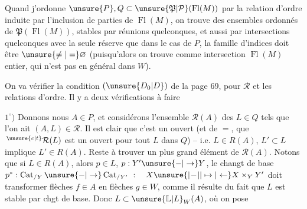Quand j'ordonne  $\unsure{P}, Q\subset\unsure{\mathfrak{P}|\mathcal{P}}(\operatorname{Fl}(M))$
par la relation d'ordre induite par l'inclusion
de parties de $\operatorname{Fl}(M)$, on trouve des ensembles
ordonnés de $\mathfrak{P}(\operatorname{Fl}(M))$, stables par réunions
quelconques, et aussi par intersections quelconques
avec la seule réserve que dans le cas de
$P$, la famille  d'indices doit être $\unsure{\ne|=}\varnothing$
(puisqu'alors on trouve comme intersection
$\operatorname{Fl}(M)$  entier, qui n'est pas en général
 dans $W$).

On va vérifier la condition $(\unsure{D_0|D})$ de la
page 69, pour $\mathcal{R}$ et les relations d'ordre.
Il y a deux vérifications à faire

$1^\circ)$ Donnons nous $A\in P$, et considérons l'ensemble
$\mathcal R(A)$ des $L\in Q$ tels que l'on ait 
$(A,L)\in\mathcal R$. Il est clair que c'est un ouvert
(et de $=$, que $\,{}^{\unsure{c|t}}\mathcal R(L)$ est un ouvert  pour
tout $L$ dans $Q$) -- i.e. $L\in R(A)$, $L'\subset L$
implique $L'\in R(A)$. Reste à trouver un
plus grand élément de $\mathcal R(A)$. Notons que
si $L\in R(A)$, alors 
$p\in L$, $p:Y'\unsure{-|\to}Y$, le changt de base
$p^{*}:\operatorname{Cat}_{/Y}\unsure{-|\to}\operatorname{Cat}_{/Y'}\ :\quad X\unsure{\vert\!-\!\vert|\mapsto|\leftarrow}X\times_Y Y'$
doit transformer flèches $f\in A$ en flèches $g\in W$,
comme il résulte du fait que
$L$ est stable par chgt de base.
Donc $L\subset\unsure{\mathbb{L}|L}_W(A)$, où on pose
